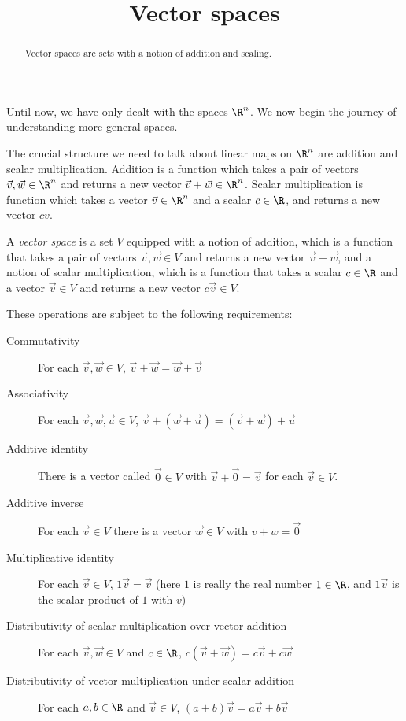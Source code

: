 \documentclass{ximera}
\title{Vector spaces}
\begin{document}
\begin{abstract}
  Vector spaces are sets with a notion of addition and scaling.
\end{abstract}

Until now, we have only dealt with the spaces $\R^n$.  We now begin the journey of understanding more general spaces.  
	
The crucial structure we need to talk about linear maps on $\R^n$ are addition and scalar multiplication.  Addition is a function which takes a 
pair of vectors $\vec{v},\vec{w} \in \R^n$ and returns a new vector $\vec{v}+\vec{w} \in \R^n$.  Scalar multiplication is function which takes a vector $\vec{v} \in \R^n$  and 
a scalar $c \in \R$, and returns a new vector $cv$.  
	
\begin{definition}
  A \textit{vector space} is a set $V$ equipped with a notion of addition, which is a function that takes a pair of vectors $\vec{v},\vec{w} \in V$ and returns 
  a new vector $\vec{v}+\vec{w}$, and a notion of scalar multiplication, which is a function that takes a scalar $c \in \R$ and a vector $\vec{v} \in V$ and returns a 
  new vector $c\vec{v} \in V$.
		
  These operations are subject to the following requirements:
		
  \begin{description}
  \item[Commutativity] For each $\vec{v},\vec{w} \in V$, $ \vec{v} +\vec{w} = \vec{w}+\vec{v}$
  \item[Associativity] For each $\vec{v},\vec{w},\vec{u} \in V$, $\vec{v} +(\vec{w} +\vec{u}) = (\vec{v} +\vec{w}) +\vec{u}$
  \item[Additive identity] There is a vector called $\vec{0} \in V$ with $\vec{v}+\vec{0} = \vec{v}$ for each $\vec{v} \in V$.
  \item[Additive inverse] For each $\vec{v} \in V$ there is a vector $\vec{w} \in V$ with $v+w = \vec{0}$
  \item[Multiplicative identity] For each $\vec{v} \in V$, $1\vec{v}= \vec{v}$ (here $1$ is really the real number $1 \in \R$, and $1\vec{v}$ is the
    scalar product of $1$ with $v$)
  \item[Distributivity of scalar multiplication over vector addition]  For each $\vec{v},\vec{w} \in V$ and $c \in \R$, $c(\vec{v}+\vec{w}) = c\vec{v} + c\vec{w}$
  \item[Distributivity of vector  multiplication under scalar addition] For each $a,b \in \R$ and $\vec{v} \in V$, $(a+b)\vec{v} = a\vec{v}+b\vec{v}$
  \end{description}
\end{definition}
\end{document}
